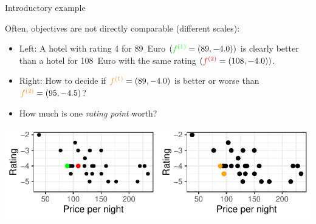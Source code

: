 \documentclass[11pt,compress,t,notes=noshow,xcolor=table]{beamer}
\begin{document}
\begin{vbframe}{Introductory example}
\framebreak

Often, objectives are not directly comparable (different scales):
\begin{itemize}
  \item Left: A hotel with rating 4 for 89~Euro 
        \((\textcolor{green}{f^{(1)}} = (89, -4.0))\) 
        is clearly better than a hotel for 108~Euro with the same rating
        \((\textcolor{red}{f^{(2)}} = (108, -4.0))\).
  \item Right: How to decide if 
        \(\textcolor{orange}{f^{(1)}}=(89, -4.0)\) is better or worse than 
        \(\textcolor{orange}{f^{(2)}}=(95, -4.5)\)?
  \item How much is one \emph{rating point} worth?
\end{itemize}

\begin{center}
\includegraphics[scale=1]{slides/11-multicrit/figure_man/expedia-2-1.pdf}
\end{center}

\end{vbframe}
\end{document}
